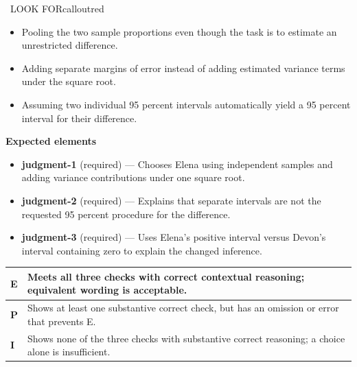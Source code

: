 \documentclass[11pt]{article}
\begin{document}
\begin{callout}{\IconWarn\ LOOK FOR}{calloutred}
\begin{itemize}[leftmargin=1.5em,itemsep=2pt,topsep=2pt]
  \item Pooling the two sample proportions even though the task is to estimate an unrestricted difference.
  \item Adding separate margins of error instead of adding estimated variance terms under the square root.
  \item Assuming two individual 95 percent intervals automatically yield a 95 percent interval for their difference.
\end{itemize}
\end{callout}


\textbf{Expected elements}
\begin{itemize}[leftmargin=1.5em,itemsep=2pt,topsep=2pt]
  \item \textbf{judgment-1} (required) --- Chooses Elena using independent samples and adding variance contributions under one square root.
  \item \textbf{judgment-2} (required) --- Explains that separate intervals are not the requested 95 percent procedure for the difference.
  \item \textbf{judgment-3} (required) --- Uses Elena's positive interval versus Devon's interval containing zero to explain the changed inference.
\end{itemize}

{\small\renewcommand{\arraystretch}{1.25}
\noindent\begin{tabular}{|p{0.5in}|p{5.9in}|}
\hline
\textbf{E} & Meets all three checks with correct contextual reasoning; equivalent wording is acceptable. \\ \hline
\textbf{P} & Shows at least one substantive correct check, but has an omission or error that prevents E. \\ \hline
\textbf{I} & Shows none of the three checks with substantive correct reasoning; a choice alone is insufficient. \\ \hline
\end{tabular}}

\clearpage
{}
\end{document}
